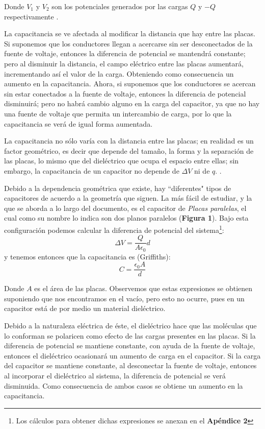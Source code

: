 \documentclass[letterpaper, 11 pt]{article}
\begin{document}
\begin{multicols}{2}
Donde $V_{1}$ y $V_{2}$ son los potenciales generados por las cargas $Q$ y $-Q$ respectivamente \cite{finn1999}.

La capacitancia se ve afectada al modificar la distancia que hay entre las placas. Si suponemos que los conductores llegan a acercarse sin ser desconectados de la fuente de voltaje, entonces la diferencia de potencial se mantendrá constante; pero al disminuir la distancia, el campo eléctrico entre las placas aumentará, incrementando así el valor de la carga. Obteniendo como consecuencia un aumento en la capacitancia.
Ahora, si suponemos que los conductores se acercan sin estar conectados a la fuente de voltaje, entonces la diferencia de potencial disminuirá; pero no habrá cambio alguno en la carga del capacitor, ya que no hay una fuente de voltaje que permita un intercambio de carga, por lo que la capacitancia se verá de igual forma aumentada.

La capacitancia no sólo varía con la distancia entre las placas; en realidad es un factor geométrico, es decir que depende del tamaño, la forma y la separación de las placas, lo mismo que del dieléctrico que ocupa el espacio entre ellas; sin embargo, la capacitancia de un capacitor no depende de $\Delta V$ ni de $q$. \cite{resnik2002}.

Debido a la dependencia geométrica que existe, hay ``diferentes" tipos de capacitores de acuerdo a la geometría que siguen. La más fácil de estudiar, y la que se aborda a lo largo del documento, es el capacitor de \textit{Placas paralelas}, el cual como su nombre lo indica son dos planos paralelos (\textbf{Figura 1}). Bajo esta configuración podemos calcular la diferencia de potencial del sistema\footnote{Los cálculos para obtener dichas expresiones se anexan en el \textbf{Apéndice 2}}:
\begin{equation}
   \Delta{V}=\frac{Q}{A \epsilon_{0}} d
\end{equation}{}
y tenemos entonces que la capacitancia es (Griffiths):
\begin{equation}
    C=\frac{ \epsilon_{0} A}{d}
\end{equation}{}

Donde $A$ es el área de las placas. Observemos que estas expresiones se obtienen suponiendo que nos encontramos en el vacío, pero esto no ocurre, pues en un capacitor está de por medio un material dieléctrico.

Debido a la naturaleza eléctrica de éste, el dieléctrico hace que las moléculas que lo conforman se polaricen como efecto de las cargas presentes en las placas. Si la diferencia de potencial se mantiene constante, con ayuda de la fuente de voltaje, entonces el dieléctrico ocasionará un aumento de carga en el capacitor. Si la carga del capacitor se mantiene constante, al desconectar la fuente de voltaje, entonces al incorporar el dieléctrico al sistema, la diferencia de potencial se verá disminuida. Como consecuencia de ambos casos se obtiene un aumento en la capacitancia.


\end{multicols}
\end{document}
